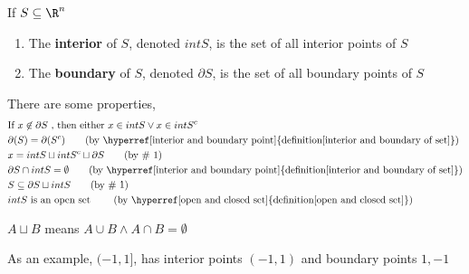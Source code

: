 \documentclass[11pt]{article}
\begin{document}
\begin{defn}
  $ $\\
  \label{interior and boundary of set}
  If $S\subseteq \R^n$
  \begin{enumerate}
    \item The \textbf{interior} of $S$, denoted $intS$, is the set of all interior points of $S$ \\
    \item The \textbf{boundary} of $S$, denoted $\partial S$, is the set of all boundary points of $S$
  \end{enumerate}

  There are some properties,
  \begin{align}
    & \text{If } x\not\in \partial S \text{ , then either } x\in intS \lor x\in intS^c \\
    & \partial (S) = \partial (S^c) \tag{by \hyperref[interior and boundary point]{definition\ref{interior and boundary of set}}} \\
    & x = intS \sqcup intS^c \sqcup \partial S \tag{by \# 1} \\
    & \partial S \cap intS = \emptyset \tag{by \hyperref[interior and boundary point]{definition\ref{interior and boundary of set}}}\\
    & S\subseteq \partial S \sqcup intS \tag{by \# 1} \\
    & intS \text{ is an open set } \tag{by \hyperref[open and closed set]{definition\ref{open and closed set}}}
  \end{align}
  \begin{note}
    $A\sqcup B$ means $A\cup B \land A\cap B = \emptyset$
  \end{note}

  \begin{rem}
    As an example, $(-1, 1]$, has interior points $(-1, 1)$ and boundary points $1, -1$
  \end{rem}
\end{defn}
\end{document}
